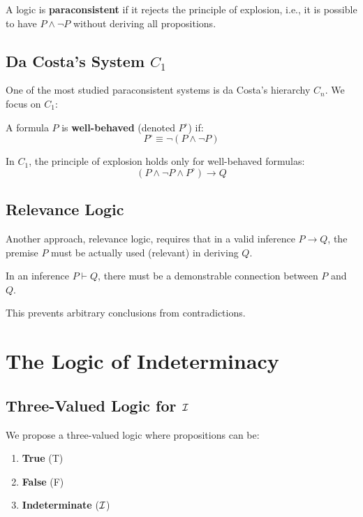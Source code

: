 \begin{definition}
A logic is \textbf{paraconsistent} if it rejects the principle of explosion, i.e., it is possible to have $P \land \neg P$ without deriving all propositions.
\end{definition}

\subsection{Da Costa's System $C_1$}

One of the most studied paraconsistent systems is da Costa's hierarchy $C_n$. We focus on $C_1$:

\begin{definition}
A formula $P$ is \textbf{well-behaved} (denoted $P^\circ$) if:
\[
P^\circ \equiv \neg(P \land \neg P)
\]
\end{definition}

In $C_1$, the principle of explosion holds only for well-behaved formulas:
\[
(P \land \neg P \land P^\circ) \rightarrow Q
\]

\subsection{Relevance Logic}

Another approach, relevance logic, requires that in a valid inference $P \rightarrow Q$, the premise $P$ must be actually used (relevant) in deriving $Q$.

\begin{axiom}
In an inference $P \vdash Q$, there must be a demonstrable connection between $P$ and $Q$.
\end{axiom}

This prevents arbitrary conclusions from contradictions.

\section{The Logic of Indeterminacy}

\subsection{Three-Valued Logic for $\mathcal{I}$}

We propose a three-valued logic where propositions can be:
\begin{enumerate}
    \item \textbf{True} (T)
    \item \textbf{False} (F)
    \item \textbf{Indeterminate} ($\mathcal{I}$)
\end{enumerate}

